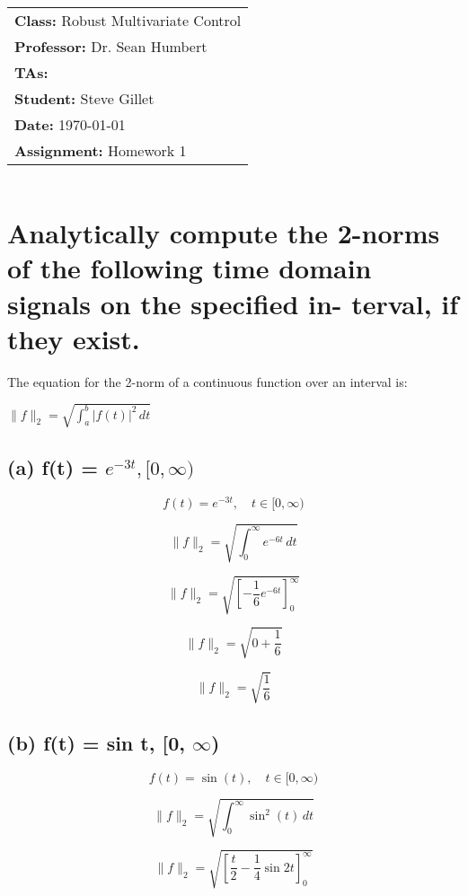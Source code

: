 \documentclass[12pt, letterpaper]{article}
\begin{document}
\title{
    \begin{tabular}{@{}l@{}}
        \textbf{Class:} Robust Multivariate Control \\
        \textbf{Professor:} Dr. Sean Humbert \\
        \textbf{TAs:}  \\
        \textbf{Student:} Steve Gillet \\
        \textbf{Date:} \today \\
        \textbf{Assignment:} Homework 1
    \end{tabular}
}

\author{}
\date{}

\maketitle

\section{Analytically compute the 2-norms of the following time domain signals on the specified in-
terval, if they exist.}

The equation for the 2-norm of a continuous function over an interval is:

$\|f\|_2 = \sqrt{\int_a^b |f(t)|^2 \, dt}$


\subsection*{(a) f(t) = $e^{-3t}, [0, \infty)$}

\[ f(t) = e^{-3t}, \quad t \in [0, \infty) \]

\[ \|f\|_2 = \sqrt{\int_{0}^{\infty} e^{-6t} \, dt} \]

\[ \|f\|_2 = \sqrt{\left[ -\frac{1}{6} e^{-6t} \right]_{0}^{\infty}} \]

\[ \|f\|_2 = \sqrt{0 + \frac{1}{6}} \]

\[ \|f\|_2 = \sqrt{\frac{1}{6}} \]


\subsection*{(b) f(t) = sin t, [0, $\infty$)}

\[ f(t) = \sin(t), \quad t \in [0, \infty) \]

\[ \|f\|_2 = \sqrt{\int_{0}^{\infty} \sin^2(t) \, dt} \]

\[ \|f\|_2 = \sqrt{\left[\frac{t}{2} - \frac{1}{4} \sin{2t} \right]_{0}^{\infty}} \]
\end{document}
